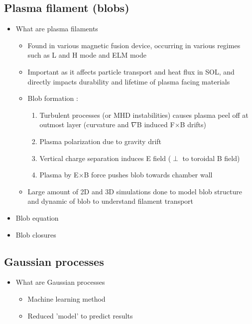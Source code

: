 \documentclass{article}
\begin{document}
\subsection*{Plasma filament (blobs)}
\begin{itemize}
    \item What are plasma filaments
    \begin{itemize}
        \item Found in various magnetic fusion device, occurring in various regimes such as L and H mode \cite{boedo_transport_2003} and ELM mode \cite{ben_ayed_inter-elm_2009}
        \item Important as it affects particle transport and heat flux in SOL, and directly impacts durability and lifetime of plasma facing materials \cite{carralero_experimental_2015, krasheninnikov_recent_2008}
        \item Blob formation \cite{krasheninnikov_recent_2008}:
        \begin{enumerate}
            \item Turbulent processes (or MHD instabilities) causes plasma peel off at outmost layer (curvature and $\nabla$B induced F$\times$B drifts)
            \item Plasma polarization due to gravity drift
            \item Vertical charge separation induces E field ($\perp$ to toroidal B field)
            \item Plasma by E$\times$B force pushes blob towards chamber wall
        \end{enumerate}
        \item Large amount of 2D and 3D simulations \cite{omotani_effects_2015, easy_three_2014, nespoli_3d_2019, garcia_mechanism_2005, shanahan_fluid_2018} done to model blob structure and dynamic of blob to understand filament transport  
    \end{itemize}
    \item Blob equation
    \item Blob closures
\end{itemize}

\subsection*{Gaussian processes} 
\begin{itemize}
    \item What are Gaussian processes \cite{hornsby_gaussian_2024}
    \begin{itemize}    
        \item Machine learning method
        \item Reduced 'model' to predict results
    \end{itemize}
\end{itemize}

\nocite{*}
\printbibliography[title={References}]
\end{document}
